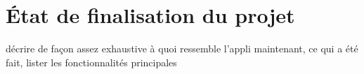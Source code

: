 \chapter{État de finalisation du projet}

décrire de façon assez exhaustive à quoi ressemble l'appli maintenant, ce qui a été fait, lister les fonctionnalités principales